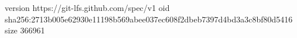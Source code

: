 version https://git-lfs.github.com/spec/v1
oid sha256:2713b005e62930e11198b569abee037ec608f2dbeb7397d4bd3a3c8bf80d5416
size 366961
